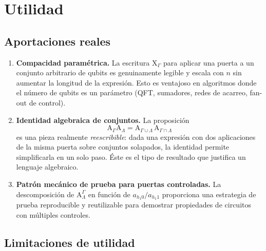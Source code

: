 \documentclass[12pt, a4paper]{article}
\newcommand{\gate}[1]{\text{#1}}
\newcommand{\stategate}[3]{\gate{#1}^{#2}_{#3}}
\begin{document}
\section{Utilidad}

\subsection{Aportaciones reales}

\begin{enumerate}
  \item \textbf{Compacidad paramétrica.}
        La escritura $\gate{X}_\Gamma$ para aplicar una puerta a un conjunto
        arbitrario de qubits es genuinamente legible y escala con $n$ sin
        aumentar la longitud de la expresión. Esto es ventajoso en algoritmos
        donde el número de qubits es un parámetro (QFT, sumadores, redes de
        acarreo, fan-out de control).

  \item \textbf{Identidad algebraica de conjuntos.}
        La proposición
        \[
          \gate{A}_\Gamma \gate{A}_\Lambda
          = \gate{A}_{\Gamma \cup \Lambda}\, \gate{A}_{\Gamma \cap \Lambda}
        \]
        es una pieza realmente \emph{reescribible}: dada una expresión con
        dos aplicaciones de la misma puerta sobre conjuntos solapados, la
        identidad permite simplificarla en un solo paso. Éste es el tipo de
        resultado que justifica un lenguaje algebraico.

  \item \textbf{Patrón mecánico de prueba para puertas controladas.}
        La descomposición de $\stategate{A}{\Gamma}{\Lambda}$ en función de
        $a_{h_1 0}/a_{h_1 1}$ proporciona una estrategia de prueba
        reproducible y reutilizable para demostrar propiedades de circuitos
        con múltiples controles.
\end{enumerate}

\subsection{Limitaciones de utilidad}
\end{document}
